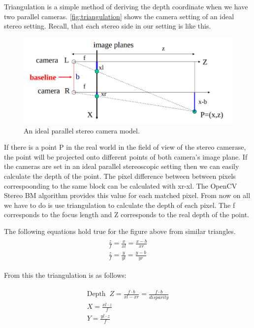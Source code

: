Triangulation is a simple method of deriving the depth coordinate when we have
two parallel cameras. \autoref{fig:triangulation} shows the camera setting of
an ideal stereo setting. Recall, that each stereo side in our setting is like
this.

\begin{figure}[!ht]
    \centering
    \includegraphics[width=150mm, keepaspectratio]{figures/triangulation.png}
    \caption{An ideal parallel stereo camera model.}
    \label{fig:triangulation}
\end{figure}

If there is a point P in the real world in the field of view of the stereo
camerase, the point will be projected onto different points of both camera's
image plane. If the cameras are set in an ideal parallel stereoscopic setting
then we can easily calculate the depth of the point. The pixel difference
between between pixels correspoonding to the same block can be calculated with
xr-xl. The OpenCV Stereo BM algorithm provides this value for each matched
pixel. From now on all we have to do is use triangulation to calculate the depth
of each pixel. The f corresponds to the focus length and Z corresponds to the
real depth of the point.

The following equations hold true for the figure above from similar triangles.
\begin{align}
    \begin{split}
        \frac{z}{f} = \frac{x}{xl} =  \frac{x-b}{xr} \\
        \frac{z}{f} = \frac{y}{yl} =  \frac{y-b}{yr}
    \end{split}
\end{align}

From this the triangulation is as follows:

\begin{align}
    \begin{split}
        \text{Depth}\;\; Z = \frac{f \cdot b}{xl - xr} =  \frac{f \cdot b}{disparity} \\
        X = \frac{xl \cdot z}{f} \\
        Y = \frac{yl \cdot z}{f}
    \end{split}
    \label{eq:depthcalc}
\end{align}

